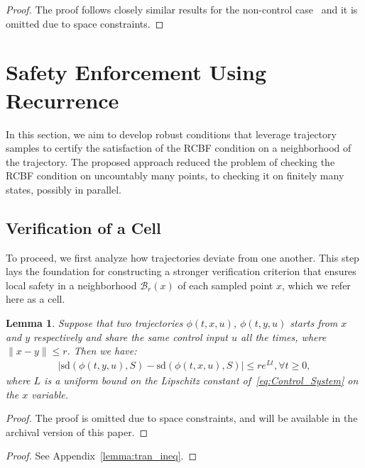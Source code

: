 \documentclass[letterpaper, 10 pt, conference]{ieeeconf}
\newtheorem{lemma}{Lemma}
\begin{document}
\begin{proof}
The proof follows closely similar results for the non-control case~\cite[Theorem 11]{ssm2024allerton} and it is omitted due to space constraints.
\end{proof}

\section{Safety Enforcement Using Recurrence}
\label{sec:approach}
 
In this section, we aim to develop robust conditions that leverage trajectory samples to certify the satisfaction of the RCBF condition on a neighborhood of the trajectory. The proposed approach reduced the problem of checking the RCBF condition on uncountably many points, to checking it on finitely many states, possibly in parallel.

\subsection{Verification of a Cell}
To proceed, we first analyze how trajectories deviate from one another. This step lays the foundation for constructing a stronger verification criterion that ensures local safety in a neighborhood $\mathcal{B}_{r}(x)$ of each sampled point $x$, which we refer here as a cell.

\begin{lemma} 
Suppose that two trajectories $\phi(t, x, u)$, $ \phi(t,y, u)$ starts from $x$ and $y$ respectively and share the same control input $u$ all the times, where $\|x - y\| \leq r$. Then we have:
\begin{align}
    |\mathrm{sd}(\phi(t, y, u), S) \!-\! \mathrm{sd}(\phi(t, x, u), S) | \leq re^{Lt}, \forall t\geq0,
\end{align}
where $L$ is a uniform bound on the Lipschitz constant of~\eqref{eq:Control_System} on the $x$ variable.
\label{lemma:triangle_inequality}
\end{lemma}

{
\begin{proof}
The proof is omitted due to space constraints, and will be available in the archival version of this paper.
\end{proof}
}{
\begin{proof} See Appendix~\ref{lemma:tran_ineq}.
\end{proof}
}
% 
\end{document}
